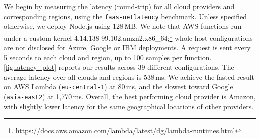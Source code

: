 We begin by measuring the latency (round-trip) for all cloud providers and corresponding regions, using the \texttt{faas-netlatency} benchmark.
Unless specified otherwise, we deploy Node.js using 128\,\gls{MB}.
We note that AWS functions run under a custom kernel 4.14.138-99.102.amzn2.x86\_64;\footnote{\url{https://docs.aws.amazon.com/lambda/latest/dg/lambda-runtimes.html}} 
whole host configurations are not disclosed for Azure, Google or IBM deployments.
A request is sent every 5 seconds to each cloud and region, up to 100 samples per function.
\autoref{fig:latency_plot} reports our results across 39 different configurations. 
The average latency over all clouds and regions is 538\,ms.
We achieve the fasted result on AWS Lambda (\texttt{eu-central-1}) at 80\,ms, and the slowest toward Google (\texttt{asia-east2}) at 1,770\,ms. 
Overall, the best performing cloud provider is Amazon, with slightly lower latency for the same geographical locations of other providers.

